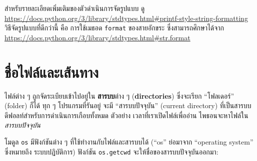 สำหรับรายละเอียดเพิ่มเติมของตัวดำเนินการจัดรูปแบบ ดู \\
%
\url{https://docs.python.org/3/library/stdtypes.html#printf-style-string-formatting}
%
วิธีจัดรูปแบบที่ดีกว่านี้%
คือ การใช้เมธอด \texttt{format} ของสายอักขระ
ซึ่งสามารถศึกษาได้จาก
\url{https://docs.python.org/3/library/stdtypes.html#str.format}





\section{ชื่อไฟล์และเส้นทาง}
\label{paths}


ไฟล์ต่าง ๆ ถูกจัดระเบียบเข้าไปอยู่ใน \textbf{สารบบ}ต่าง ๆ (\textbf{directories}) ซึ่งจะเรียก ``โฟลเดอร์'' (folder) ก็ได้
ทุก ๆ โปรแกรมที่รันอยู่ จะมี ``สารบบปัจจุบัน'' (current directory) 
ที่เป็นสารบบดีฟอลท์สำหรับการดำเนินการเกือบทั้งหมด
ตัวอย่าง เวลาที่เราเปิดไฟล์เพื่ออ่าน ไพธอนจะหาไฟล์ใน\textit{สารบบปัจจุบัน}


โมดูล \texttt{os} มีฟังก์ชันต่าง ๆ ที่ใช้ทำงานกับไฟล์และสารบบได้ 
(``os'' ย่อมาจาก ``operating system'' ซึ่งหมายถึง ระบบปฏิบัติการ)
ฟังก์ชัน \texttt{os.getcwd} จะให้ชื่อของสารบบปัจจุบันออกมา:

